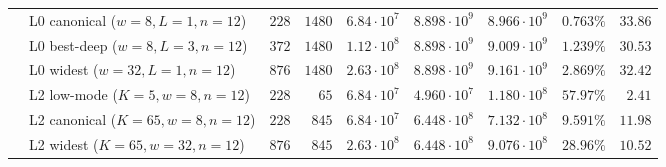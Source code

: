 \begin{table}[!htbp]
{\begin{tabular}{@{}llrrrrrrr@{}}
 & L0 canonical ($w{=}8, L{=}1, n{=}12$) & $228$ & $1480$ & $6.84\cdot 10^7$ & $8.898\cdot 10^9$ & $8.966\cdot 10^9$ & $\mathbf{0.763\%}$ & $33.86$ \\
 & L0 best-deep ($w{=}8, L{=}3, n{=}12$) & $372$ & $1480$ & $1.12\cdot 10^8$ & $8.898\cdot 10^9$ & $9.009\cdot 10^9$ & $\mathbf{1.239\%}$ & $30.53$ \\
 & L0 widest ($w{=}32, L{=}1, n{=}12$)   & $876$ & $1480$ & $2.63\cdot 10^8$ & $8.898\cdot 10^9$ & $9.161\cdot 10^9$ & $\mathbf{2.869\%}$ & $32.42$ \\
 & L2 low-mode ($K{=}5, w{=}8, n{=}12$)  & $228$ & $65$   & $6.84\cdot 10^7$ & $4.960\cdot 10^7$ & $1.180\cdot 10^8$ & $\mathbf{57.97\%}$ & $2.41$ \\
 & L2 canonical ($K{=}65, w{=}8, n{=}12$)& $228$ & $845$  & $6.84\cdot 10^7$ & $6.448\cdot 10^8$ & $7.132\cdot 10^8$ & $\mathbf{9.591\%}$ & $11.98$ \\
 & L2 widest ($K{=}65, w{=}32, n{=}12$)  & $876$ & $845$  & $2.63\cdot 10^8$ & $6.448\cdot 10^8$ & $9.076\cdot 10^8$ & $\mathbf{28.96\%}$ & $10.52$ \\
\bottomrule
\end{tabular}
}
\end{table}

